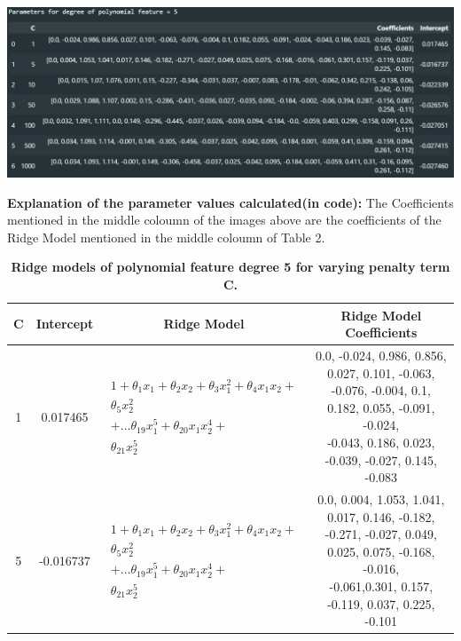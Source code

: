 \documentclass[10pt]{article}
\begin{document}
\begin{center}
  \includegraphics[scale=0.4]{./images/Table_10.png}
\end{center}
\textbf{Explanation of the parameter values calculated(in code):}
The Coefficients mentioned in the middle coloumn of the images above are the coefficients of the Ridge Model mentioned in the middle coloumn of Table 2.
\begin{table}[H]
  \begin{center}
    \caption{\textbf{Ridge models of polynomial feature degree 5 for varying penalty term C.} }
    \begin{tabular}{ |c|c|c|c| }
      \hline
      C    & Intercept & Ridge Model                                                                                                                                                                                                                                        & Ridge Model Coefficients                                   \\
      \hline
      1    & 0.017465  & $\begin{aligned}1 + \theta_{1}x_{1} + \theta_{2}x_{2} + \theta_{3}x_{1}^{2}+ \theta_{4}x_{1}x_{2}+\\\nonumber \theta_{5}x_{2}^{2}\\\nonumber+\dots \theta_{19}x_{1}^{5}+ \theta_{20}x_{1}x_{2}^{4}+ \\\nonumber \theta_{21}x_{2}^{5}\end{aligned}$ & \makecell{0.0, -0.024, 0.986, 0.856, 0.027, 0.101, -0.063, \\-0.076, -0.004, 0.1, 0.182, 0.055, -0.091, -0.024, \\-0.043, 0.186, 0.023, -0.039, -0.027, 0.145, -0.083} \\
      \hline
      5    & -0.016737 & $\begin{aligned}1 + \theta_{1}x_{1} + \theta_{2}x_{2} + \theta_{3}x_{1}^{2}+ \theta_{4}x_{1}x_{2}+\\\nonumber \theta_{5}x_{2}^{2}\\\nonumber+\dots \theta_{19}x_{1}^{5}+ \theta_{20}x_{1}x_{2}^{4}+ \\\nonumber \theta_{21}x_{2}^{5}\end{aligned}$ & \makecell{0.0, 0.004, 1.053, 1.041, 0.017, 0.146, -0.182,  \\-0.271, -0.027, 0.049, 0.025, 0.075, -0.168, -0.016, \\-0.061,0.301, 0.157, -0.119, 0.037, 0.225, -0.101} \\

\end{tabular}
\end{center}
\end{table}
\end{document}
